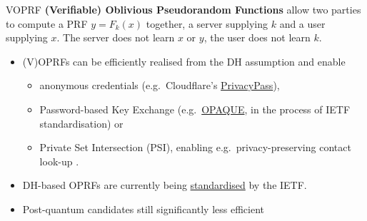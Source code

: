 \documentclass[xcolor=table,10pt,aspectratio=169]{beamer}
\begin{document}
\begin{frame}[label={sec:orgb54290d}]{VOPRF}
\textbf{(Verifiable) Oblivious Pseudorandom Functions} allow two parties to compute a PRF \(y = F_k(x)\) together, a server supplying \(k\) and a user supplying \(x\). The server does not learn \(x\) or \(y\), the user does not learn \(k\).
\begin{itemize}
\item (V)OPRFs can be efficiently realised from the DH assumption and enable
\begin{itemize}
\item anonymous credentials (e.g. Cloudflare’s \href{https://privacypass.github.io/}{PrivacyPass}),
\item Password-based Key Exchange (e.g. \href{https://datatracker.ietf.org/doc/draft-irtf-cfrg-opaque/}{OPAQUE}, in the process of IETF standardisation) or
\item Private Set Intersection (PSI), enabling e.g. privacy-preserving contact look-up \cite{CCS:CHLR18}.
\end{itemize}
\item DH-based OPRFs are currently being \href{https://datatracker.ietf.org/doc/draft-irtf-cfrg-voprf/}{standardised} by the IETF.
\item Post-quantum candidates still significantly less efficient 
\end{itemize}
\end{frame}
\end{document}
